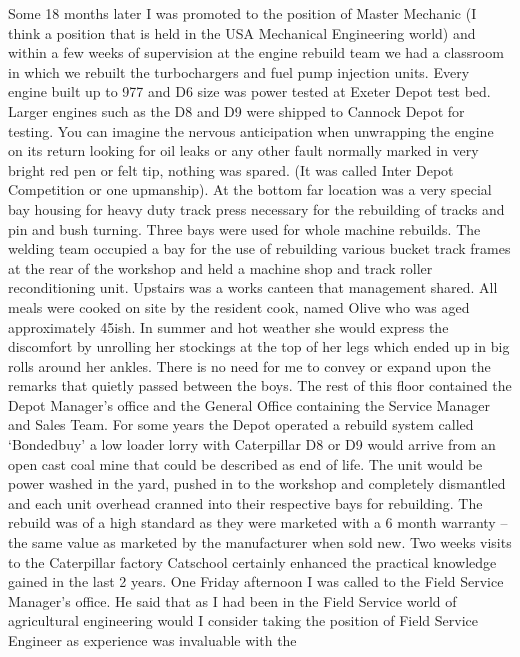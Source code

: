 
Some 18 months later I was promoted to the position of Master Mechanic (I think
a position that is held in the USA Mechanical Engineering world) and within a
few weeks of supervision at the engine rebuild team we had a classroom in which
we rebuilt the turbochargers and fuel pump injection units.  Every engine built
up to 977 and D6 size was power tested at Exeter Depot test bed.  Larger
engines such as the D8 and D9 were shipped to Cannock Depot for testing.  You
can imagine the nervous anticipation when unwrapping the engine on its return
looking for oil leaks or any other fault normally marked in very bright red pen
or felt tip, nothing was spared.  (It was called Inter Depot Competition or one
upmanship).  At the bottom far location was a very special bay housing for
heavy duty track press necessary for the rebuilding of tracks and pin and bush
turning.  Three bays were used for whole machine rebuilds.  The welding team
occupied a bay for the use of rebuilding various bucket track frames at the
rear of the workshop and held a machine shop and track roller reconditioning
unit.  Upstairs was a works canteen that management shared.  All meals were
cooked on site by the resident cook, named Olive who was aged approximately
45ish.  In summer and hot weather she would express the discomfort by unrolling
her stockings at the top of her legs which ended up in big rolls around her
ankles.  There is no need for me to convey or expand upon the remarks that
quietly passed between the boys. The rest of this floor contained the Depot
Manager's office and the General Office containing the Service Manager and
Sales Team.  For some years the Depot operated a rebuild system
called ‘Bondedbuy' a low loader lorry with Caterpillar D8 or D9 would arrive
from an open cast coal mine that could be described as end of life.  The unit
would be power washed in the yard, pushed in to the workshop and completely
dismantled and each unit overhead cranned into their respective bays for
rebuilding.  The rebuild was of a high standard as they were marketed with a 6
month warranty – the same value as marketed by the manufacturer when sold new.
Two weeks visits to the Caterpillar factory Catschool certainly enhanced the
practical knowledge gained in the last 2 years. One Friday afternoon I was
called to the Field Service Manager's office.  He said that as I had been in
the Field Service world of agricultural engineering would I consider taking the
position of Field Service Engineer as experience was invaluable with the
